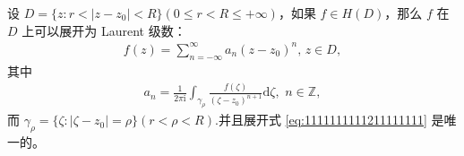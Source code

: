 \documentclass[../../main.tex]{subfiles}%
\begin{document}
\begin{theorem}[Laurent定理]\label{theorem:定理5.1.2}
设 \( D = \{ z: r < |z - z_0| < R \} (0\leqslant r<R\leqslant +\infty)\)，如果 \( f \in H(D) \)，那么 \( f \) 在 \( D \) 上可以展开为 Laurent 级数：
\begin{align}
f(z) = \sum_{n = -\infty}^{\infty} a_n (z - z_0)^n, \, z \in D, \label{eq:1111111111211111111}
\end{align}
其中
\begin{align*}
a_n = \frac{1}{2\pi \mathrm{i}} \int_{\gamma_{\rho}} \frac{f(\zeta)}{(\zeta - z_0)^{n + 1}} \mathrm{d}\zeta,\,\,n\in \mathbb{Z},
\end{align*}
而 \( \gamma_{\rho} = \{ \zeta: |\zeta - z_0| = \rho \} \)\(( r < \rho < R) \).并且展开式 \eqref{eq:1111111111211111111} 是唯一的。
\end{theorem}
\end{document}
